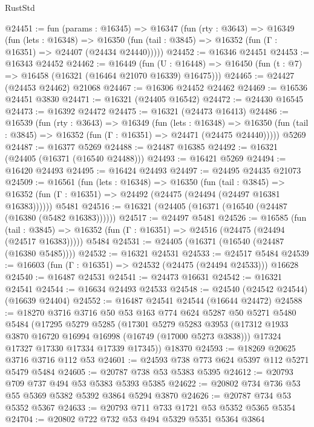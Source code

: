 \begin{lexlean}{RustStd}
\begin{coremodule}
@24451 := fun (params : @16345) =>
  @16347
    (fun (rty : @3643) =>
    @16349
      (fun (lets : @16348) =>
      @16350 (fun (tail : @3845) => @16352 (fun (Γ : @16351) => @24407 (@24434 @24440)))))
@24452 := @16346 @24451
@24453 := @16343 @24452
@24462 := @16449
    (fun (U : @16448) => @16450 (fun (t : @7) => @16458 (@16321 (@16464 @21070 @16339) @16475)))
@24465 := @24427 (@24453 @24462) @21068
@24467 := @16306 @24452 @24462
@24469 := @16536 @24451 @3830
@24471 := @16321 (@24405 @16542)
@24472 := @24430 @16545
@24473 := @16392 @24472
@24475 := @16321 (@24473 @16413)
@24486 := @16539
    (fun (rty : @3643) =>
    @16349
      (fun (lets : @16348) =>
      @16350 (fun (tail : @3845) => @16352 (fun (Γ : @16351) => @24471 (@24475 @24440)))))
    @5269
@24487 := @16377 @5269
@24488 := @24487 @16385
@24492 := @16321 (@24405 (@16371 (@16540 @24488)))
@24493 := @16421 @5269
@24494 := @16420 @24493
@24495 := @16424 @24493
@24497 := @24495 @24435 @21073
@24509 := @16561
    (fun (lets : @16348) =>
    @16350
      (fun (tail : @3845) =>
      @16352 (fun (Γ : @16351) => @24492 (@24475 (@24494 (@24497 @16381 @16383))))))
    @5481
@24516 := @16321 (@24405 (@16371 (@16540 (@24487 (@16380 (@5482 @16383))))))
@24517 := @24497 @5481
@24526 := @16585
    (fun (tail : @3845) => @16352 (fun (Γ : @16351) => @24516 (@24475 (@24494 (@24517 @16383)))))
    @5484
@24531 := @24405 (@16371 (@16540 (@24487 (@16380 @5485))))
@24532 := @16321 @24531
@24533 := @24517 @5484
@24539 := @16603 (fun (Γ : @16351) => @24532 (@24475 (@24494 @24533))) @16628
@24540 := @16487 @24531
@24541 := @24473 @16631
@24542 := @16321 @24541
@24544 := @16634 @24493 @24533
@24548 := @24540 (@24542 @24544) (@16639 @24404)
@24552 := @16487 @24541 @24544 (@16644 @24472)
@24588 := @18270
    @3716
    @3716
    @50
    @53
    @163
    @774
    @624
    @5287
    @50
    @5271
    @5480
    @5484
    (@17295
      @5279
      @5285
      (@17301
        @5279
        @5283
        @3953
        (@17312 @1933 @3870 @16720 @16994 @16998 (@16749 (@17000 @5273 @3838)))
        @17324
        @17327
        @17330
        @17334
        @17339
        @17345))
    @18370
@24593 := @18269 @20625 @3716 @3716 @112 @53
@24601 := @24593 @738 @773 @624 @5397 @112 @5271 @5479 @5484
@24605 := @20787 @738 @53 @5383 @5395
@24612 := @20793 @709 @737 @494 @53 @5383 @5393 @5385
@24622 := @20802 @734 @736 @53 @55 @5369 @5382 @5392 @3864 @5294 @3870
@24626 := @20787 @734 @53 @5352 @5367
@24633 := @20793 @711 @733 @1721 @53 @5352 @5365 @5354
@24704 := @20802
    @722
    @732
    @53
    @494
    @5329
    @5351
    @5364
    @3864

\end{coremodule}
\end{lexlean}
